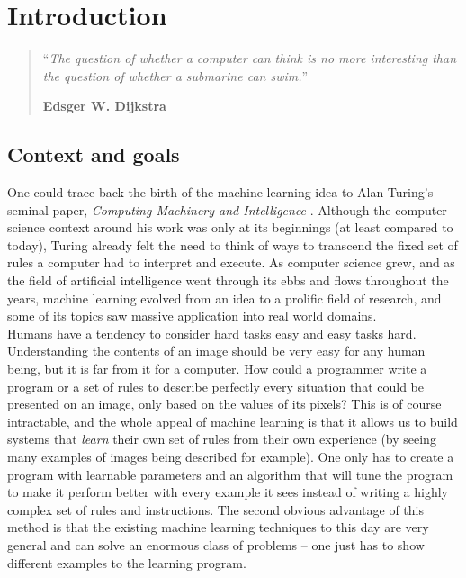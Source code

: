 \chapter{Introduction}
\setcounter{page}{1}
\begin{quotation}
\noindent ``\emph{The question of whether a computer can think is no more 
	interesting than the question of whether a submarine can swim.}''
\begin{flushright}\textbf{Edsger W. Dijkstra}\end{flushright}
\end{quotation}

\vspace*{0.5cm}

\section{Context and goals}
One could trace back the birth of the machine learning idea to Alan Turing's 
seminal paper, \textit{Computing Machinery and Intelligence} 
\cite{turing1950computing}. Although the computer science context around his
work was only at its beginnings (at least compared to today), Turing already felt
the need to think of ways to transcend the fixed set of rules a computer had
to interpret and execute. As computer science grew, and as the field of
artificial intelligence went through its ebbs and flows throughout the years,
machine learning evolved from an idea to a prolific field of research, and
some of its topics saw massive application into real world domains.\\

Humans have a tendency to consider hard tasks easy and easy tasks hard.
Understanding the contents of an image should be very easy for any human
being, but it is far from it for a computer. How could a programmer write
a program or a set of rules to describe perfectly every situation that could
be presented on an image, only based on the values of its pixels? This is
of course intractable, and the whole appeal of machine learning is that it
allows us to build systems that \textit{learn} their own set of rules from
their own experience (by seeing many examples of images being described for 
example). One only has to create a program with learnable parameters and an
algorithm that will tune the program to make it perform better with every
example it sees instead of writing a highly complex set of rules and 
instructions. The second obvious advantage of this method is that the existing
machine learning techniques to this day are very general and can solve an
enormous class of problems -- one just has to show different examples to the
learning program.\\

